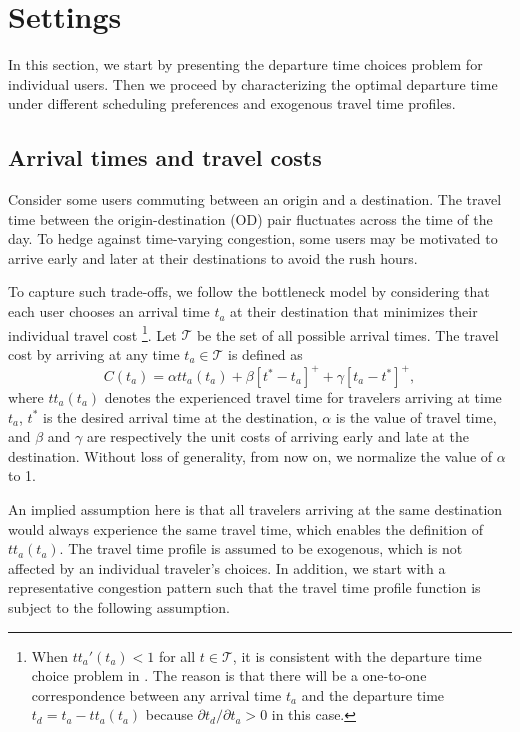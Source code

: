 \section{Settings}
In this section, we start by presenting the departure time choices problem for individual users. Then we proceed by characterizing the optimal departure time under different scheduling preferences and exogenous travel time profiles.


\subsection{Arrival times and travel costs}
\label{sec:cost_fn}

\label{sec:theory}

Consider some users commuting between an origin and a destination. The travel time between the origin-destination (OD) pair fluctuates across the time of the day. To hedge against time-varying congestion, some users may be motivated to arrive early and later at their destinations to avoid the rush hours.



To capture such trade-offs, we follow the bottleneck model by considering that each user chooses an arrival time $t_a$ at their destination that minimizes their individual travel cost  \footnote{When $tt_a'(t_a) < 1$ for all $t \in \mathcal{T}$, it is consistent with the departure time choice problem in \cite{arnott1993structural}. The reason is that there will be a one-to-one correspondence between any arrival time $t_a$ and the departure time $t_d = t_a - tt_a(t_a)$ because $\partial t_d/\partial t_a > 0$ in this case. }. Let $\mathcal{T}$ be the set of all possible arrival times. The travel cost by arriving at any time $t_a 
 \in \mathcal{T}$ is defined as 
\begin{equation}
  \label{eq:cost_ta}
  C(t_a) = \alpha tt_a(t_a) + \beta[t^*-t_a]^+ + \gamma[t_a-t^*]^+,
\end{equation}
where $tt_a(t_a)$ denotes the experienced travel time for travelers arriving at time $t_a$, \(t^*\) is the desired arrival time at the destination,  \(\alpha\) is the value of travel time, and \(\beta\) and \(\gamma\) are respectively the unit costs of arriving early and late at the destination. Without loss of generality, from now on, we normalize the value of $\alpha$ to 1.


 An implied assumption here is that all travelers arriving at the same destination would always experience the same travel time, which enables the definition of $tt_a(t_a)$. The travel time profile is assumed to be exogenous, which is not affected by an individual traveler's choices.  In addition, we start with a representative congestion pattern such that the travel time profile function is subject to the following assumption. 


